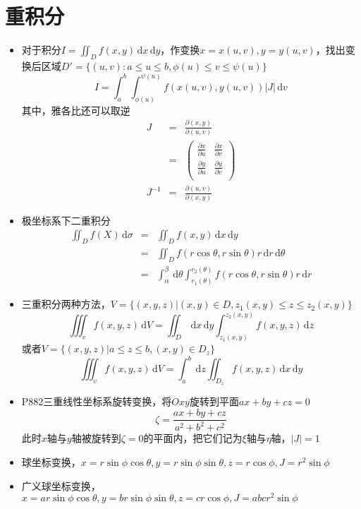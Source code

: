 \documentclass[UTF8]{ctexart}
\newcommand{\ud}{\,\mathrm{d}}
\begin{document}
\section{重积分}
\begin{itemize}
\item 对于积分$I=\iint_D f(x,y)\ud x\ud y$，作变换$x=x(u,v),y=y(u,v)$，找出变换后区域$D'=\{(u,v):a\leq u\leq b,\phi(u)\leq v\leq \psi(u)\}$
\[
I=\int_a^b\int_{\phi(u)}^{\psi(u)} f(x(u,v),y(u,v))|J|\ud v
\]
其中，雅各比还可以取逆
\begin{eqnarray*}
J&=&\frac{\partial(x,y)}{\partial(u,v)}\\
&=& \left(
\begin{array}{cc}
\frac{\partial x}{\partial u}&\frac{\partial x}{\partial v}\\
\frac{\partial y}{\partial u}&\frac{\partial y}{\partial v}\\
\end{array}
\right)\\
J^{-1}&=&\frac{\partial(u,v)}{\partial(x,y)}
\end{eqnarray*}

\item 极坐标系下二重积分
\begin{eqnarray*}
\iint_D f(X)\ud \sigma&=&\iint_D f(x,y)\ud x\ud y\\
&=&\iint_D f(r\cos \theta,r\sin \theta)r\ud r\ud \theta\\
&=&\int_\alpha^\beta \ud \theta \int_{r_1(\theta)}^{r_2(\theta)} f(r\cos \theta,r\sin \theta)r\ud r
\end{eqnarray*}

\item 三重积分两种方法，$V=\{(x,y,z)|(x,y)\in D,z_1(x,y)\leq z \leq z_2(x,y) \}$
\[
\iiint_v f(x,y,z)\ud V = \iint_D \ud x\ud y\int_{z_1(x,y)}^{z_2(x,y)} f(x,y,z)\ud z
\]
或者$V=\{(x,y,z)|a\leq z \leq b,(x,y)\in D_z \}$
\[
\iiint_v f(x,y,z)\ud V = \int_a^b \ud z \iint_{D_z}f(x,y,z)\ud x\ud y
\]

\item P882三重线性坐标系旋转变换，将$Oxy$旋转到平面$ax+by+cz=0$
\[
\zeta = \frac{ax+by+cz}{a^2+b^2+c^2}
\]
此时$x$轴与$y$轴被旋转到$\zeta=0$的平面内，把它们记为$\xi$轴与$\eta$轴，$|J|=1$

\item 球坐标变换，$x=r\sin\phi\cos\theta,y=r\sin\phi\sin\theta,z=r\cos\phi,J=r^2\sin\phi$

\item 广义球坐标变换，$x=ar\sin\phi\cos\theta,y=br\sin\phi\sin\theta,z=cr\cos\phi,J=abcr^2\sin\phi$

\end{itemize}
\end{document}
